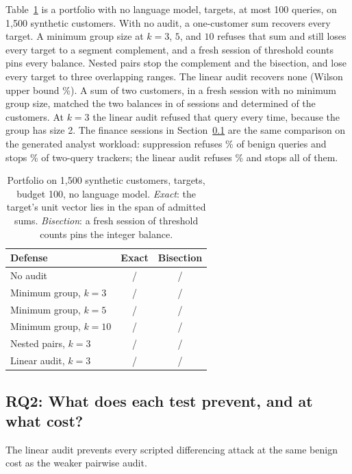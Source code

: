 \documentclass[sigconf,nonacm]{acmart}
\begin{document}
Table~\ref{tab:gap} is a portfolio with no language model, \Nrevn{} targets, at most 100 queries, on 1{,}500 synthetic customers. With no audit, a one-customer sum recovers every target. A minimum group size at $k=3$, $5$, and $10$ refuses that sum and still loses every target to a segment complement, and a fresh session of threshold counts pins every balance. Nested pairs stop the complement and the bisection, and lose every target to three overlapping ranges. The linear audit recovers none (Wilson upper bound \Nrevwilson\%). A sum of two customers, in a fresh session with no minimum group size, matched the two balances in \Nrevpairsum{} of \Nrevn{} sessions and determined \Nrevpairexact{} of the customers. At $k=3$ the linear audit refused that query every time, because the group has size 2. The finance sessions in Section~\ref{sec:prevent} are the same comparison on the generated analyst workload: suppression refuses \Nrefkthreestateless\% of benign queries and stops \Nprevkthreestatelesstracker\% of two-query trackers; the linear audit refuses \Nrefkthreelinear\% and stops all of them.

\begin{table}[!t]
\caption{Portfolio on 1{,}500 synthetic customers, \Nrevn{} targets, budget 100, no language model. \emph{Exact}: the target's unit vector lies in the span of admitted sums. \emph{Bisection}: a fresh session of threshold counts pins the integer balance.}
\label{tab:gap}
\centering\footnotesize
\begin{tabular}{@{}lcc@{}}
\toprule
Defense & Exact & Bisection\\
\midrule
No audit & \Nrevnone{} / \Nrevn{} & \Nrevnonebis{} / \Nrevn{}\\
Minimum group, $k=3$ & \Nrevstatelesskthree{} / \Nrevn{} & \Nrevstatelesskthreebis{} / \Nrevn{}\\
Minimum group, $k=5$ & \Nrevstatelesskfive{} / \Nrevn{} & \Nrevstatelesskfivebis{} / \Nrevn{}\\
Minimum group, $k=10$ & \Nrevstatelesskten{} / \Nrevn{} & \Nrevstatelessktenbis{} / \Nrevn{}\\
Nested pairs, $k=3$ & \Nrevpairwisekthree{} / \Nrevn{} & \Nrevpairwisekthreebis{} / \Nrevn{}\\
Linear audit, $k=3$ & \Nrevlinearkthree{} / \Nrevn{} & \Nrevlinearkthreebis{} / \Nrevn{}\\
\bottomrule
\end{tabular}
\end{table}

\subsection{RQ2: What does each test prevent, and at what cost?}\label{sec:prevent}
The linear audit prevents every scripted differencing attack at the same benign cost as the weaker pairwise audit.
\end{document}

